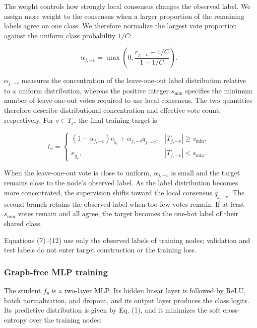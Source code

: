 \documentclass[10pt,letterpaper]{elsarticle}
\begin{document}
The weight controls how strongly local consensus changes the observed label. We assign more weight to the consensus when a larger proportion of the remaining labels agree on one class. We therefore normalize the largest vote proportion against the uniform class probability \(1/C\):

\begin{equation}\label{eq:11}
\alpha_{j, - v} = \max\left( 0,\frac{r_{j, - v} - 1/C}{1 - 1/C} \right).
\end{equation}

\(\alpha_{j, - v}\) measures the concentration of the leave-one-out label distribution relative to a uniform distribution, whereas the positive integer \(s_{\min}\) specifies the minimum number of leave-one-out votes required to use local consensus. The two quantities therefore describe distributional concentration and effective vote count, respectively. For \(v \in T_{j}\), the final training target is

\begin{equation}\label{eq:12}
t_{v} = \begin{cases}
(1 - \alpha_{j, - v})e_{{\widetilde{y}}_{v}} + \alpha_{j, - v}q_{j, - v}, & |T_{j, - v}| \geq s_{\min}, \\
e_{{\widetilde{y}}_{v}}, & |T_{j, - v}| < s_{\min}.
\end{cases}
\end{equation}

When the leave-one-out vote is close to uniform, \(\alpha_{j, - v}\) is small and the target remains close to the node's observed label. As the label distribution becomes more concentrated, the supervision shifts toward the local consensus \(q_{j, - v}\). The second branch retains the observed label when too few votes remain. If at least \(s_{\min}\) votes remain and all agree, the target becomes the one-hot label of their shared class.

Equations (7)--(12) use only the observed labels of training nodes; validation and test labels do not enter target construction or the training loss.

\subsubsection{Graph-free MLP training}\label{sec:3.4.3}

The student \(f_{\theta}\) is a two-layer MLP. Its hidden linear layer is followed by ReLU, batch normalization, and dropout, and its output layer produces the class logits. Its predictive distribution is given by Eq. (1), and it minimizes the soft cross-entropy over the training nodes:
\end{document}
